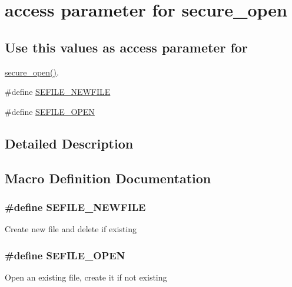\hypertarget{group__access}{\section{access parameter for secure\-\_\-open}
\label{group__access}
}
\subsection*{Use this values as access parameter for}
\label{_amgrp2ed59a0e5c494bd4fc39975773a63d09}%
\hyperlink{_s_efile_8c_ae99f8ccb396cbb5685d9e16bb3dbbe98}{secure\-\_\-open()}. \begin{DoxyCompactItemize}
\item 
\#define \hyperlink{group__access_ga57c4f0752b0acce2d45dff73592e09e3}{S\-E\-F\-I\-L\-E\-\_\-\-N\-E\-W\-F\-I\-L\-E}
\item 
\#define \hyperlink{group__access_ga3912e29a65705156f8d2e7ffe7fe80c7}{S\-E\-F\-I\-L\-E\-\_\-\-O\-P\-E\-N}
\end{DoxyCompactItemize}


\subsection{Detailed Description}


\subsection{Macro Definition Documentation}
\hypertarget{group__access_ga57c4f0752b0acce2d45dff73592e09e3}{
\subsubsection[{S\-E\-F\-I\-L\-E\-\_\-\-N\-E\-W\-F\-I\-L\-E}]{\setlength{\rightskip}{0pt plus 5cm}\#define S\-E\-F\-I\-L\-E\-\_\-\-N\-E\-W\-F\-I\-L\-E}}\label{group__access_ga57c4f0752b0acce2d45dff73592e09e3}
Create new file and delete if existing \hypertarget{group__access_ga3912e29a65705156f8d2e7ffe7fe80c7}{
\subsubsection[{S\-E\-F\-I\-L\-E\-\_\-\-O\-P\-E\-N}]{\setlength{\rightskip}{0pt plus 5cm}\#define S\-E\-F\-I\-L\-E\-\_\-\-O\-P\-E\-N}}\label{group__access_ga3912e29a65705156f8d2e7ffe7fe80c7}
Open an existing file, create it if not existing 
